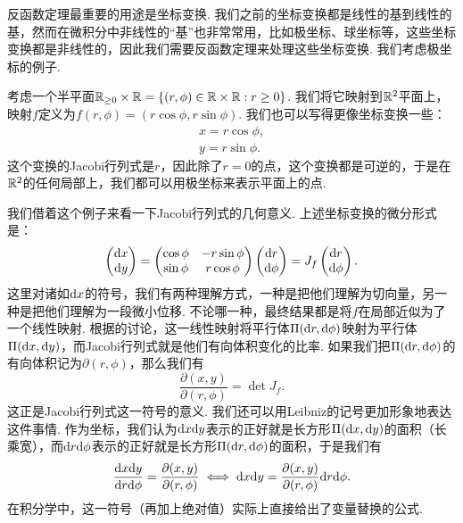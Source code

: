 反函数定理最重要的用途是坐标变换. 我们之前的坐标变换都是线性的基到线性的基，然而在微积分中非线性的“基”也非常常用，比如极坐标、球坐标等，这些坐标变换都是非线性的，因此我们需要反函数定理来处理这些坐标变换. 我们考虑极坐标的例子. 

\begin{example}[极坐标]\label{ex:polar-coordinates}
    考虑一个半平面$\mathbb{R}_{\geq 0}\times\mathbb{R}=\{(r,\phi)\in\mathbb{R}\times\mathbb{R}:r\geq 0\}$. 我们将它映射到$\mathbb{R}^2$平面上，映射$f$定义为$f(r,\phi)=(r\cos\phi,r\sin\phi)$. 我们也可以写得更像坐标变换一些：
    \begin{gather*}
        x=r\cos\phi, \\
        y=r\sin\phi.
    \end{gather*}
    这个变换的Jacobi行列式是$r$，因此除了$r=0$的点，这个变换都是可逆的，于是在$\mathbb{R}^2$的任何局部上，我们都可以用极坐标来表示平面上的点.

    我们借着这个例子来看一下Jacobi行列式的几何意义. 上述坐标变换的微分形式是：
    \[\begin{pmatrix}
        \mathrm{d} x \\
        \mathrm{d} y
    \end{pmatrix}=\begin{pmatrix}
        \cos\phi & -r\sin\phi \\
        \sin\phi & r\cos\phi
    \end{pmatrix}\begin{pmatrix}
        \mathrm{d} r \\
        \mathrm{d}\phi
    \end{pmatrix}=J_f \begin{pmatrix}
        \mathrm{d} r \\
        \mathrm{d}\phi
    \end{pmatrix}.\]
    这里对诸如$\mathrm{d} x$的符号，我们有两种理解方式，一种是把他们理解为切向量，另一种是把他们理解为一段微小位移. 不论哪一种，最终结果都是将$f$在局部近似为了一个线性映射. 根据的讨论，这一线性映射将平行体$\Pi(\mathrm{d} r,\mathrm{d} \phi)$映射为平行体$\Pi(\mathrm{d} x,\mathrm{d} y)$，而Jacobi行列式就是他们有向体积变化的比率. 如果我们把$\Pi(\mathrm{d} r,\mathrm{d} \phi)$的有向体积记为$\partial(r,\phi)$，那么我们有
    \[\frac{\partial(x,y)}{\partial(r,\phi)}=\det J_f.\]
    这正是Jacobi行列式这一符号的意义. 我们还可以用Leibniz的记号更加形象地表达这件事情. 作为坐标，我们认为$\mathrm{d} x\mathrm{d} y$表示的正好就是长方形$\Pi(\mathrm{d} x,\mathrm{d} y)$的面积（长乘宽），而$\mathrm{d} r\mathrm{d}\phi$表示的正好就是长方形$\Pi(\mathrm{d} r,\mathrm{d} \phi)$的面积，于是我们有
    \[\frac{\mathrm{d} x\mathrm{d} y}{\mathrm{d} r\mathrm{d}\phi}=\frac{\partial(x,y)}{\partial(r,\phi)}\iff \mathrm{d} x \mathrm{d} y= \frac{\partial(x,y)}{\partial(r,\phi)}\mathrm{d} r\mathrm{d}\phi.\]
    在积分学中，这一符号（再加上绝对值）实际上直接给出了变量替换的公式.
\end{example}